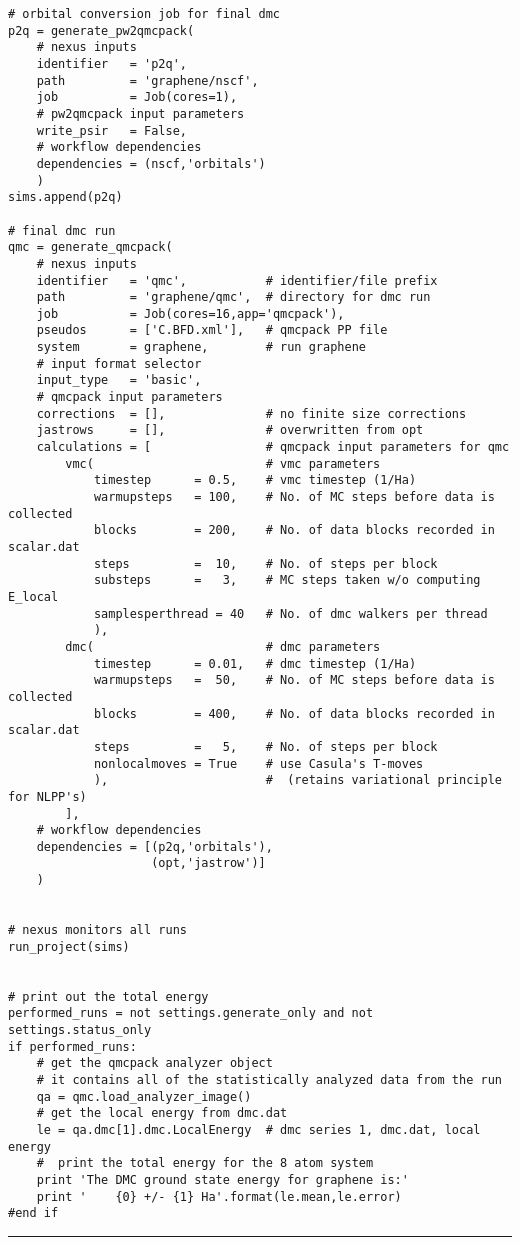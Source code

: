 \documentclass[oneside,11pt]{memoir}
\numberwithin{equation}{section}
\newcommand{\HRule}{\rule{\linewidth}{0.5mm}}
\begin{document}
\begin{verbatim}
# orbital conversion job for final dmc
p2q = generate_pw2qmcpack(
    # nexus inputs
    identifier   = 'p2q',
    path         = 'graphene/nscf',
    job          = Job(cores=1),
    # pw2qmcpack input parameters
    write_psir   = False,
    # workflow dependencies
    dependencies = (nscf,'orbitals')
    )
sims.append(p2q)
    
# final dmc run
qmc = generate_qmcpack( 
    # nexus inputs
    identifier   = 'qmc',           # identifier/file prefix       
    path         = 'graphene/qmc',  # directory for dmc run       
    job          = Job(cores=16,app='qmcpack'),
    pseudos      = ['C.BFD.xml'],   # qmcpack PP file
    system       = graphene,        # run graphene
    # input format selector                                      
    input_type   = 'basic',
    # qmcpack input parameters
    corrections  = [],              # no finite size corrections
    jastrows     = [],              # overwritten from opt
    calculations = [                # qmcpack input parameters for qmc
        vmc(                        # vmc parameters 
            timestep      = 0.5,    # vmc timestep (1/Ha)
            warmupsteps   = 100,    # No. of MC steps before data is collected
            blocks        = 200,    # No. of data blocks recorded in scalar.dat
            steps         =  10,    # No. of steps per block
            substeps      =   3,    # MC steps taken w/o computing E_local
            samplesperthread = 40   # No. of dmc walkers per thread
            ),                      
        dmc(                        # dmc parameters
            timestep      = 0.01,   # dmc timestep (1/Ha)
            warmupsteps   =  50,    # No. of MC steps before data is collected
            blocks        = 400,    # No. of data blocks recorded in scalar.dat
            steps         =   5,    # No. of steps per block
            nonlocalmoves = True    # use Casula's T-moves
            ),                      #  (retains variational principle for NLPP's)
        ],
    # workflow dependencies
    dependencies = [(p2q,'orbitals'),
                    (opt,'jastrow')]
    )


# nexus monitors all runs
run_project(sims)


# print out the total energy
performed_runs = not settings.generate_only and not settings.status_only
if performed_runs:
    # get the qmcpack analyzer object
    # it contains all of the statistically analyzed data from the run
    qa = qmc.load_analyzer_image()
    # get the local energy from dmc.dat
    le = qa.dmc[1].dmc.LocalEnergy  # dmc series 1, dmc.dat, local energy
    #  print the total energy for the 8 atom system
    print 'The DMC ground state energy for graphene is:'
    print '    {0} +/- {1} Ha'.format(le.mean,le.error)
#end if
\end{verbatim}
\HRule
\end{document}
